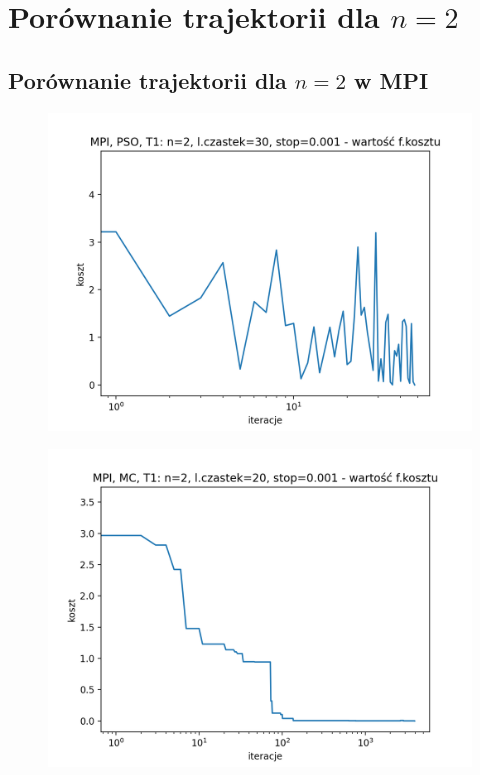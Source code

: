 \documentclass[11pt, a4paper, oneside]{article}
\begin{document}
\section{Porównanie trajektorii dla $n = 2$}

\subsection{Porównanie trajektorii dla $n = 2$ w MPI}

\begin{figure}[H]
\centering
\begin{minipage}[b]{\dimexpr.5\textwidth-1em}
  \centering
  \includegraphics[width=1\linewidth]{grafiki2/MPI_PSO_T1/MPI_PSO_T1_koszt.png}
  \label{fig:pozycjeStartowe:PSO1}
\end{minipage} \hfill
\begin{minipage}[b]{\dimexpr.5\textwidth-1em}
  \centering
  \includegraphics[width=1\linewidth]{grafiki2/MPI_MC_T1/MPI_MC_T1_koszt.png}
  \label{fig:pozycjeStartowe:MC1}
\end{minipage}
\end{figure}
\end{document}
